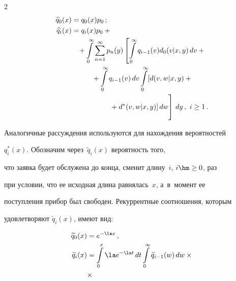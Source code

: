 \begin{multicols}{2}
\begin{align*}
\widehat{q}_0(x) &= {q}_0(x)p_0\,;


\\


{\widehat{q}_i(x)}&= {q}_i(x)p_0+{}\\


&\hspace*{3mm}{}+


\int\limits_0^\infty \sum\limits_{n=1}^\infty p_n(y)


\left [ \int\limits_0^\infty {q}_{i-1}(v)d_0(v|x,y)\,dv


+{}\right.\\


&\hspace*{10mm}{}+


\int\limits_0^\infty {q}_{i-1}(v)\,dv


\int\limits_0^\infty [d(v,w|x,y)+{}\\


&\hspace*{18mm}\left.{}+d^*(v,w|x,y)]\,dw


\vphantom{\int\limits_0^\infty {q}_{i-1}}


\right]\,dy\,, \ i\ge 1\,.


\end{align*}





Аналогичные рассуждения используются для нахождения вероятностей


$q_i^*(x)$. Обозначим через~$\widetilde{q}_i(x)$ вероятность того,


что заявка будет обслужена до конца, сменит длину~$i$, $i\hm\ge0$, раз


при условии, что ее исходная длина равнялась~$x$, а~в~момент ее


поступления прибор был свободен. Рекуррентные соотношения, которым


удовлетворяют $\widetilde{q}_i(x)$, имеют вид:


\begin{align*}


\widetilde{q}_0(x)&=e^{-\la x}\,,


\\


\widetilde{q}_i(x)&= \int\limits_0^x \la e^{-\la t}\,dt


\int\limits_0^\infty \widetilde{q}_{i-1}(w) \, dw\times{}\\


&{}\times



\end{align*}
\end{multicols}

